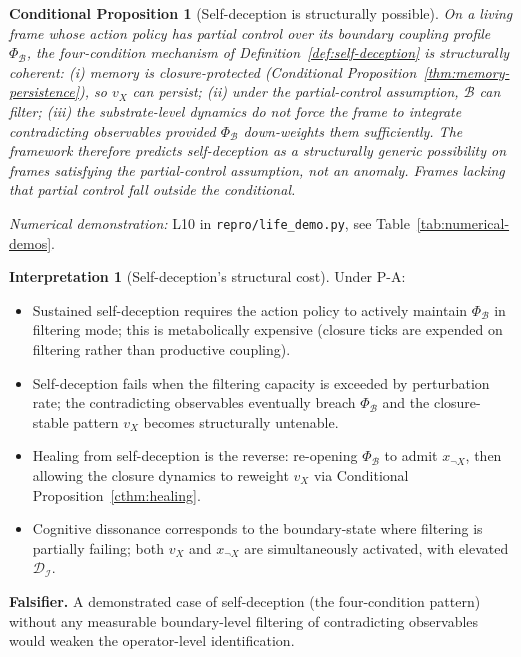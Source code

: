 \documentclass[11pt]{article}
\theoremstyle{plain}
\newtheorem{conditional}[theorem]{Conditional Proposition}
\theoremstyle{definition}
\newtheorem{interpretation}[theorem]{Interpretation}
\theoremstyle{remark}
\newcommand{\Ical}{\mathcal{I}}
\newcommand{\Bcal}{\mathcal{B}}
\newcommand{\Dcal}{\mathcal{D}}
\begin{document}
\begin{conditional}[Self-deception is structurally possible]\label{thm:self-deception}
On a living frame whose action policy has partial control over its boundary coupling profile $\Phi_\Bcal$, the four-condition mechanism of Definition~\ref{def:self-deception} is structurally coherent: (i) memory is closure-protected (Conditional Proposition~\ref{thm:memory-persistence}), so $v_X$ can persist; (ii) under the partial-control assumption, $\Bcal$ can filter; (iii) the substrate-level dynamics do not force the frame to integrate contradicting observables provided $\Phi_\Bcal$ down-weights them sufficiently. The framework therefore predicts self-deception as a structurally generic possibility on frames satisfying the partial-control assumption, not an anomaly. Frames lacking that partial control fall outside the conditional.
\end{conditional}

\noindent\emph{Numerical demonstration:} L10 in \texttt{repro/life\_demo.py}, see Table~\ref{tab:numerical-demos}.


\begin{interpretation}[Self-deception's structural cost]\label{int:self-deception}
Under P-A:
\begin{itemize}[leftmargin=2em]
\item Sustained self-deception requires the action policy to actively maintain $\Phi_\Bcal$ in filtering mode; this is metabolically expensive (closure ticks are expended on filtering rather than productive coupling).
\item Self-deception fails when the filtering capacity is exceeded by perturbation rate; the contradicting observables eventually breach $\Phi_\Bcal$ and the closure-stable pattern $v_X$ becomes structurally untenable.
\item Healing from self-deception is the reverse: re-opening $\Phi_\Bcal$ to admit $x_{\neg X}$, then allowing the closure dynamics to reweight $v_X$ via Conditional Proposition~\ref{cthm:healing}.
\item Cognitive dissonance corresponds to the boundary-state where filtering is partially failing; both $v_X$ and $x_{\neg X}$ are simultaneously activated, with elevated $\Dcal_\Ical$.
\end{itemize}
\end{interpretation}

\textbf{Falsifier.} A demonstrated case of self-deception (the four-condition pattern) without any measurable boundary-level filtering of contradicting observables would weaken the operator-level identification.
\end{document}
